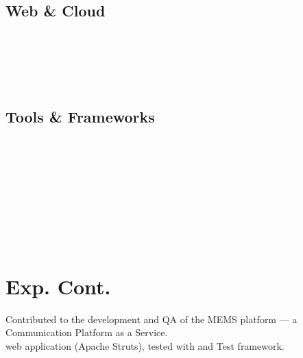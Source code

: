\documentclass[a4paper]{resume}
\begin{document}
\begin{minipage}[t]{0.33\textwidth}
	\subsection{Web \& Cloud}
	\smallsectionspace{}
	\xml{} \textbullet{} \json{} \\
	\css{} \textbullet{} \react{} \\
	\aws{} \boto{} \textbullet{} \ectwo{} \textbullet{} \rds{} \\
	\jnciaJunos{} \textbullet{} \jnciaDevOps{} \\
	\sectionspace{}

	\subsection{Tools \& Frameworks}
	\smallsectionspace{}
	\mongo{} \\
	\linux{} \textbullet{} \git{} \textbullet{} \docker{} \\
	\cmake{} \textbullet{} \conan{} \textbullet{} \gdb{} \\
	\pytest{} \textbullet{} \asyncio{} \\
	\nodejs{} \textbullet{} \spring{} \\
	\googletest{} \textbullet{} \junit{} \\
	\cucumber{} \\
	\ansible{} \textbullet{} \jenkins{} \\

	\section{Exp. Cont.}
	\smallsectionspace{}

	\textbullet{} Contributed to the development and QA of the MEMS platform --- a Communication Platform as a Service. \\
	\textbullet{} \java{} web application (Apache Struts), tested with \junit{} and \cucumber{} Test framework. \\
	\smallsectionspace{}

\end{minipage} %
\hfill
%
\end{document}
